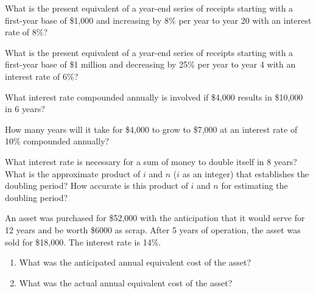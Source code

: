 \begin{exercises}
    \begin{exercise}
    \label{sea-8-4}
        What is the present equivalent of a year-end series of receipts starting with a first-year base of \$1,000 and increasing by 8\% per year to year 20 with an interest rate of 8\%?
    \end{exercise}
    \begin{solution}
    \end{solution}
    
    \begin{exercise}
    \label{sea-8-5}
        What is the present equivalent of a year-end series of receipts starting with a first-year base of \$1 million and decreasing by 25\% per year to year 4 with an interest rate of 6\%?
    \end{exercise}
    \begin{solution}
    \end{solution}
    
    \begin{exercise}
    \label{sea-8-6}
        What interest rate compounded annually is involved if \$4,000 results in \$10,000 in 6 years?
    \end{exercise}
    \begin{solution}
    \end{solution}
    
    \begin{exercise}
    \label{sea-8-7}
        How many years will it take for \$4,000 to grow to \$7,000 at an interest rate of 10\% compounded annually?
    \end{exercise}
    \begin{solution}
    \end{solution}
    
    \begin{exercise}
    \label{sea-8-8}
        What interest rate is necessary for a sum of money to double itself in 8 years? What is the approximate product of $i$ and $n$ ($i$ as an integer) that establishes the doubling period? How accurate is this product of $i$ and $n$ for estimating the doubling period?
    \end{exercise}
    \begin{solution}
    \end{solution}
    
    \begin{exercise}
    \label{sea-8-9}
        An asset was purchased for \$52,000 with the anticipation that it would serve for 12 years and be worth \$6000 as scrap. After 5 years of operation, the asset was sold for \$18,000. The interest rate is 14\%.
        \begin{enumerate}[label=\alph*)]
            \item What was the anticipated annual equivalent cost of the asset?
            \item What was the actual annual equivalent cost of the asset?
        \end{enumerate}
    \end{exercise}
    \begin{solution}
    \end{solution}
    

\end{exercises}
